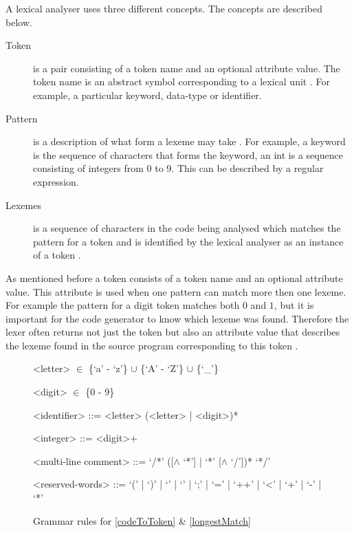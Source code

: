 A lexical analyser uses three different concepts. The concepts are described 
below. 
\begin{description}
  \item[Token]
    is a pair consisting of a token name and an optional attribute value. The 
token name is an abstract symbol corresponding to a lexical unit \cite{Aho2006}. 
For example, a particular keyword, data-type or identifier.
  \item[Pattern]
    is a description of what form a lexeme may take \cite{Aho2006}. 
For example, a keyword is the sequence of characters that forms the 
keyword, an int is a sequence consisting of integers from 0 to 9. This can
be described by a regular expression.
  \item[Lexemes]
    is a sequence of characters in the code being analysed which 
matches the pattern for a token and is identified by the lexical analyser as an 
instance of a token \cite{Aho2006}.
\end{description}
As mentioned before a token consists of a token name and an optional attribute value. 
This attribute is used when one pattern can match more then one lexeme.
For example the pattern for a digit token matches both $0$ and $1$, 
but it is important for the code generator to know which lexeme was found. 
Therefore the lexer often returns not just the token but also an attribute value 
that describes the lexeme found in the source program corresponding to this 
token \cite{Aho2006}.

\begin{figure}[h!]
\begin{center}
\begin{grammar}

<letter>  $\in$ \{`a' - `z'\} $\cup$ \{`A' - `Z'\} $\cup$ \{`_'\}

<digit>  $\in$ \{0 - 9\}

<identifier> ::= <letter> (<letter> | <digit>)* 

<integer> ::= <digit>+

<multi-line comment> ::= `/*' ([$\wedge$ `*'] | `*' [$\wedge$ `/'])* `*/'

<reserved-words> ::= `(' | `)' | `{' | `}' | `;' | `=' | `++' | `<' | `+' | `-' | `*'

\end{grammar}
\caption{Grammar rules for \cref{codeToToken} \& \cref{longestMatch}\label{fig:grammar}}
\end{center}
\end{figure}

